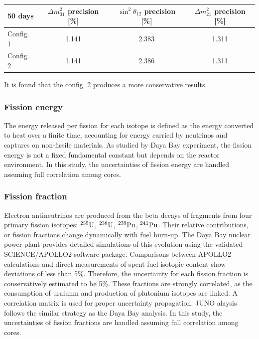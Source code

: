     \vspace{0.5em}
    \begin{tabular}{|l|c|c|c|}
        \hline
        \textbf{50 days} & $\Delta m^2_{31}$ precision [\%] & $\sin^2\theta_{12}$ precision [\%] & $\Delta m^2_{21}$ precision [\%] \\
        \hline
        Config. 1 & 1.141 & 2.383 & 1.311 \\
        \hline
        Config. 2 & 1.141 & 2.386 & 1.311 \\
        \hline
    \end{tabular}
   
    It is found that the config. 2 produces a more conservative results. 


\subsubsection{Fission energy}
The energy released per fission for each isotope is defined as the energy converted to heat over a finite time, accounting for energy carried by neutrinos and captures on non-fissile materials. 
As studied by Daya Bay experiment, the fission energy is not a fixed fundamental constant but depends on the reactor environment.
In this study, the uncertainties of fission energy are handled assuming full correlation among cores.


\subsubsection{Fission fraction}
Electron antineutrinos are produced from the beta decays of fragments from four primary fission isotopes: $^{235}\rm U$, $^{238}\rm U$, $^{239}\rm{Pu}$, $^{241}\rm{Pu}$. Their relative contributions, or fission fractions change dynamically with fuel burn-up. 
The Daya Bay nuclear power plant provides detailed simulations of this evolution using the validated SCIENCE/APOLLO2 software package. Comparisons between APOLLO2 calculations and direct measurements of spent fuel isotopic content show deviations of less than 5\%. 
Therefore, the uncertainty for each fission fraction is conservatively estimated to be 5\%. These fractions are strongly correlated, as the consumption of uraiunm and production of plutonium isotopes are linked. A correlation matrix is used for proper uncertainty propagation.
JUNO alaysis follows the similar strategy as the Daya Bay analysis. 
In this study, the uncertainties of fission fractions are handled assuming full correlation among cores.



